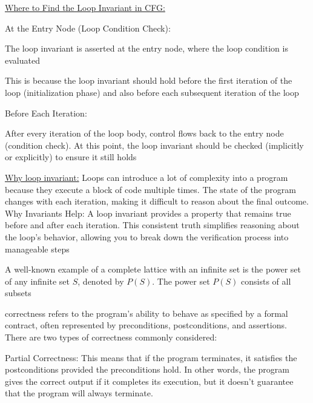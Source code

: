 \documentclass[landscape, a4paper]{article}
\begin{document}
\begin{minipage}[t]{0.2\linewidth}
\begin{betterlist}
\begin{betterlist}
		\end{betterlist}
		\item \underline{Where to Find the Loop Invariant in CFG:}
		\begin{betterlist}
			\item At the Entry Node (Loop Condition Check):
			\begin{betterlist}
				\item The loop invariant is asserted at the entry node, where the loop condition is evaluated
				\item This is because the loop invariant should hold before the first iteration of the loop (initialization phase) and also before each subsequent iteration of the loop
			\end{betterlist}
			\item Before Each Iteration:
			\begin{betterlist}
				\item After every iteration of the loop body, control flows back to the entry node (condition check). At this point, the loop invariant should be checked (implicitly or explicitly) to ensure it still holds
			\end{betterlist}
		\end{betterlist}
		\item \underline{Why loop invariant:} Loops can introduce a lot of complexity into a program because they execute a block of code multiple times. The state of the program changes with each iteration, making it difficult to reason about the final outcome. Why Invariants Help: A loop invariant provides a property that remains true before and after each iteration. This consistent truth simplifies reasoning about the loop's behavior, allowing you to break down the verification process into manageable steps
		\item A well-known example of a complete lattice with an infinite set is the power set of any infinite set $S$, denoted by $P(S)$. The power set $P(S)$ consists of all subsets
		\item \alert{correctness} refers to the program’s ability to behave as specified by a formal contract, often represented by preconditions, postconditions, and assertions. There are two types of correctness commonly considered:
		\begin{betterlist}
			\item \alert{Partial Correctness:} This means that if the program terminates, it satisfies the postconditions provided the preconditions hold. In other words, the program gives the correct output if it completes its execution, but it doesn't guarantee that the program will always terminate.

\end{betterlist}
\end{betterlist}
\end{minipage}
\end{document}
